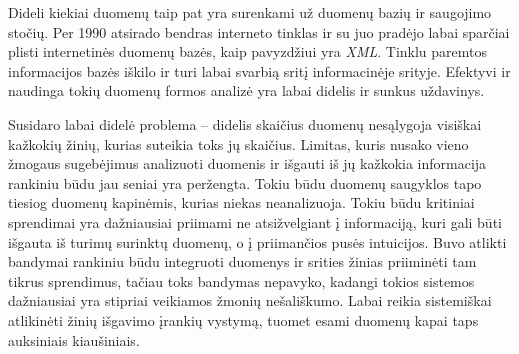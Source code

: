 Dideli kiekiai duomenų taip pat yra surenkami už duomenų bazių ir saugojimo stočių. Per 1990 atsirado bendras interneto tinklas ir su juo pradėjo labai sparčiai plisti internetinės duomenų bazės, kaip pavyzdžiui yra \textit{XML}.
Tinklu paremtos informacijos bazės iškilo ir turi labai svarbią sritį informacinėje srityje.
Efektyvi ir naudinga tokių duomenų formos analizė yra labai didelis ir sunkus uždavinys.

Susidaro labai didelė problema -- didelis skaičius duomenų nesąlygoja visiškai kažkokių žinių, kurias suteikia toks jų skaičius.
Limitas, kuris nusako vieno žmogaus sugebėjimus analizuoti duomenis ir išgauti iš jų kažkokia informacija rankiniu būdu jau seniai yra peržengta.
Tokiu būdu duomenų saugyklos tapo tiesiog duomenų kapinėmis, kurias niekas neanalizuoja.
Tokiu būdu kritiniai sprendimai yra dažniausiai priimami ne atsižvelgiant į informaciją, kuri gali būti išgauta iš turimų surinktų duomenų, o į priimančios pusės intuicijos.
Buvo atlikti bandymai rankiniu būdu integruoti duomenys ir srities žinias priiminėti tam tikrus sprendimus, tačiau toks bandymas nepavyko, kadangi tokios sistemos dažniausiai yra stipriai veikiamos žmonių nešališkumo.
Labai reikia sistemiškai atlikinėti žinių išgavimo įrankių vystymą, tuomet esami duomenų kapai taps auksiniais kiaušiniais.



